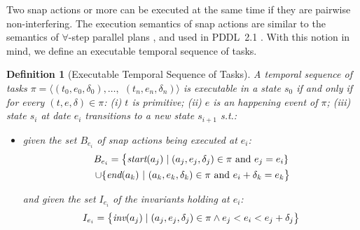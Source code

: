 \documentclass[letterpaper]{article} %
\newtheorem{definition}{Definition}
\newcommand{\tstart}{\text{\it start}}
\newcommand{\tend}{\text{\it end}}
\newcommand{\tinv}{\text{\it inv}}
\begin{document}
Two snap actions or more can be executed at the same time if they are pairwise non-interfering. The execution semantics of snap actions are similar to the semantics of $\forall$-step parallel plans \cite{rintanen06}, and used in PDDL~2.1 \cite{fox03}. With this notion in mind, we define an executable temporal sequence of tasks.

\begin{definition}[Executable Temporal Sequence of Tasks]
  A temporal sequence of tasks $\pi = \langle (t_0, e_0, \delta_0), \ldots,$ $(t_n, e_n, \delta_n) \rangle$ is executable in a state $s_0$ if and only if for every $(t, e, \delta)\! \in \!\pi$:
  (i) $t$ is primitive;
  (ii) $e$ is an happening event of $\pi$;
  (iii) %
  state $s_i$ at date $e_i$ transitions to a new state $s_{i+1}$ s.t.: 
\begin{itemize}
  \item given the set $B_{e_i}$ of snap actions being executed at $e_i$:
    \begin{multline*}
      B_{e_i} = \bigl\{ \tstart(a_j) \; | \;  (a_j, e_j, \delta_j) \in \pi \text{ and } e_j = e_i \}\\
      \; \cup  \{\tend(a_k) \ | \ (a_k, e_k, \delta_k) \in \pi \text{ and } e_i + \delta_k = e_k\bigr\}
    \end{multline*}
    
 and given the set $I_{e_i}$ of the invariants holding at $e_i$:
    \begin{equation*}
      I_{e_i} = \bigl\{ \tinv(a_j) \; | \; (a_j, e_j, \delta_j) \in \pi \wedge e_j < e_i < e_j + \delta_j\bigr\}
    \end{equation*}


\end{itemize}
\end{definition}
\end{document}
